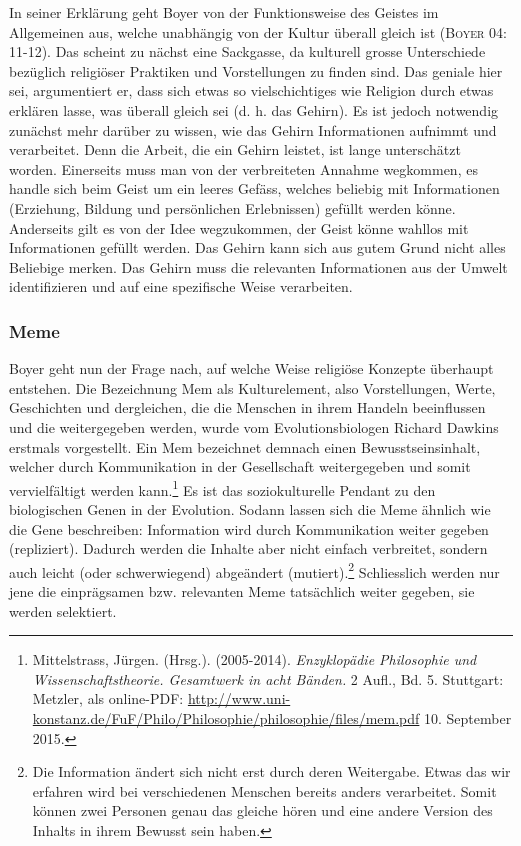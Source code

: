 In seiner Erklärung geht Boyer von der Funktionsweise des Geistes im Allgemeinen aus, welche unabhängig von der Kultur überall gleich ist (\textsc{Boyer 04: 11-12}). Das scheint zu nächst eine Sackgasse, da kulturell grosse Unterschiede bezüglich religiöser Praktiken und Vorstellungen zu finden sind. Das geniale hier sei, argumentiert er, dass sich etwas so vielschichtiges wie Religion durch etwas erklären lasse, was überall gleich sei (d. h. das Gehirn). Es ist jedoch notwendig zunächst mehr darüber zu wissen, wie das Gehirn Informationen aufnimmt und verarbeitet. Denn die Arbeit, die ein Gehirn leistet, ist lange unterschätzt worden. Einerseits muss man von der verbreiteten Annahme wegkommen, es handle sich beim Geist um ein leeres Gefäss, welches beliebig mit Informationen (Erziehung, Bildung und persönlichen Erlebnissen) gefüllt werden könne. Anderseits gilt es von der Idee wegzukommen, der Geist könne wahllos mit Informationen gefüllt werden. Das Gehirn kann sich aus gutem Grund nicht alles Beliebige merken. Das Gehirn muss die relevanten Informationen aus der Umwelt identifizieren und auf eine spezifische Weise verarbeiten. 

\subsubsection{Meme}
Boyer geht nun der Frage nach, auf welche Weise religiöse Konzepte überhaupt entstehen. Die Bezeichnung Mem als Kulturelement, also Vorstellungen, Werte, Geschichten und dergleichen, die die Menschen in ihrem Handeln beeinflussen und die weitergegeben werden, wurde vom Evolutionsbiologen Richard Dawkins erstmals vorgestellt. Ein Mem bezeichnet demnach einen Bewusstseinsinhalt, welcher durch Kommunikation in der Gesellschaft weitergegeben und somit vervielfältigt werden kann.\footnote{Mittelstrass, Jürgen. (Hrsg.). (2005-2014). \emph{Enzyklopädie Philosophie und Wissenschaftstheorie. Gesamtwerk in acht Bänden.} 2 Aufl., Bd. 5. Stuttgart: Metzler, als online-PDF: \url{http://www.uni-konstanz.de/FuF/Philo/Philosophie/philosophie/files/mem.pdf} 10. September 2015.} Es ist das soziokulturelle Pendant zu den biologischen Genen in der Evolution. Sodann lassen sich die Meme ähnlich wie die Gene beschreiben: Information wird durch Kommunikation weiter gegeben (repliziert). Dadurch werden die Inhalte aber nicht einfach verbreitet, sondern auch leicht (oder schwerwiegend) abgeändert (mutiert).\footnote{Die Information ändert sich nicht erst durch deren Weitergabe. Etwas das wir erfahren wird bei verschiedenen Menschen bereits anders verarbeitet. Somit können zwei Personen genau das gleiche hören und eine andere Version des Inhalts in ihrem Bewusst sein haben.} Schliesslich werden nur jene die einprägsamen bzw. relevanten Meme tatsächlich weiter gegeben, sie werden selektiert.

